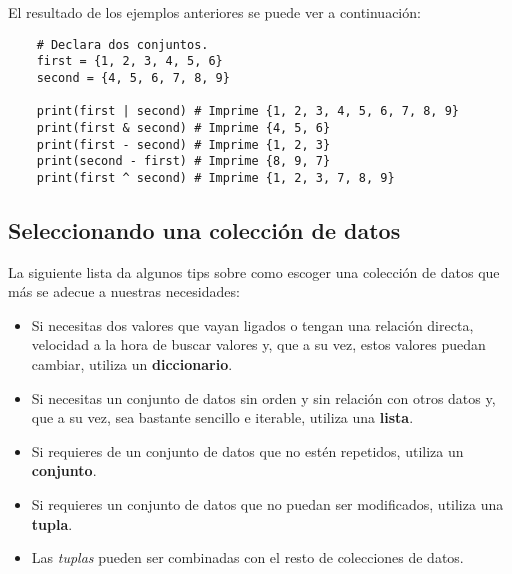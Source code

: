 El resultado de los ejemplos anteriores se puede ver a continuación:
\begin{lstlisting}
    # Declara dos conjuntos.
    first = {1, 2, 3, 4, 5, 6}
    second = {4, 5, 6, 7, 8, 9}

    print(first | second) # Imprime {1, 2, 3, 4, 5, 6, 7, 8, 9}
    print(first & second) # Imprime {4, 5, 6}
    print(first - second) # Imprime {1, 2, 3}
    print(second - first) # Imprime {8, 9, 7}
    print(first ^ second) # Imprime {1, 2, 3, 7, 8, 9}
\end{lstlisting}


\subsection{Seleccionando una colección de datos}

La siguiente lista da algunos tips sobre como escoger una colección de datos que más se adecue a nuestras necesidades:
\begin{itemize}
	\item Si necesitas dos valores que vayan ligados o tengan una relación directa, velocidad a la hora de buscar valores y, que a su vez, estos valores puedan cambiar, utiliza un \textbf{diccionario}.
	\item Si necesitas un conjunto de datos sin orden y sin relación con otros datos y, que a su vez, sea bastante sencillo e iterable, utiliza una \textbf{lista}.
	\item Si requieres de un conjunto de datos que no estén repetidos, utiliza un \textbf{conjunto}.
	\item Si requieres un conjunto de datos que no puedan ser modificados, utiliza una \textbf{tupla}.
	\item Las \textit{tuplas} pueden ser combinadas con el resto de colecciones de datos.
\end{itemize}
